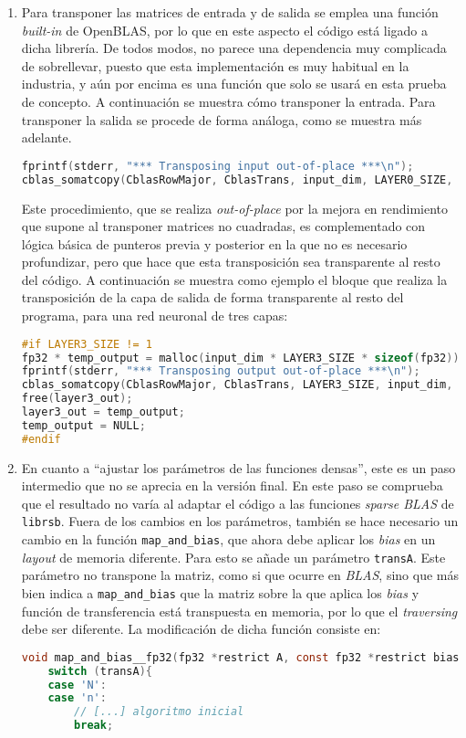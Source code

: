 \begin{enumerate}
    \item Para transponer las matrices de entrada y de salida se emplea una función \textit{built-in} de OpenBLAS, por lo que en este aspecto el código está ligado a dicha librería. De todos modos, no parece una dependencia muy complicada de sobrellevar, puesto que esta implementación es muy habitual en la industria, y aún por encima es una función que solo se usará en esta prueba de concepto. A continuación se muestra cómo transponer la entrada. Para transponer la salida se procede de forma análoga, como se muestra más adelante.\medskip
\begin{lstlisting}[language=C]
fprintf(stderr, "*** Transposing input out-of-place ***\n");
cblas_somatcopy(CblasRowMajor, CblasTrans, input_dim, LAYER0_SIZE, 1.f, (float *) input, LAYER0_SIZE, (float *) temp_input, input_dim);
\end{lstlisting}

    Este procedimiento, que se realiza \textit{out-of-place} por la mejora en rendimiento que supone al transponer matrices no cuadradas, es complementado con lógica básica de punteros previa y posterior en la que no es necesario profundizar, pero que hace que esta transposición sea transparente al resto del código. A continuación se muestra como ejemplo el bloque que realiza la transposición de la capa de salida de forma transparente al resto del programa, para una red neuronal de tres capas:\medskip
\begin{lstlisting}[language=C]
#if LAYER3_SIZE != 1
fp32 * temp_output = malloc(input_dim * LAYER3_SIZE * sizeof(fp32));
fprintf(stderr, "*** Transposing output out-of-place ***\n");
cblas_somatcopy(CblasRowMajor, CblasTrans, LAYER3_SIZE, input_dim, 1.f, (float *) layer3_out, input_dim, (float *) temp_output, LAYER3_SIZE);
free(layer3_out);
layer3_out = temp_output;
temp_output = NULL;
#endif
\end{lstlisting}

    \item En cuanto a ``ajustar los parámetros de las funciones densas'', este es un paso intermedio que no se aprecia en la versión final. En este paso se comprueba que el resultado no varía al adaptar el código a las funciones \textit{sparse BLAS} de \texttt{librsb}. Fuera de los cambios en los parámetros, también se hace necesario un cambio en la función \texttt{map\_and\_bias}, que ahora debe aplicar los \textit{bias} en un \textit{layout} de memoria diferente. Para esto se añade un parámetro \texttt{transA}. Este parámetro no transpone la matriz, como si que ocurre en \textit{BLAS}, sino que más bien indica a \texttt{map\_and\_bias} que la matriz sobre la que aplica los \textit{bias} y función de transferencia está transpuesta en memoria, por lo que el \textit{traversing} debe ser diferente. La modificación de dicha función consiste en:\medskip
\begin{lstlisting}[language=C]
void map_and_bias__fp32(fp32 *restrict A, const fp32 *restrict bias, const uint32_t M, const uint32_t N, const char transA, fp32 (* map_function)(fp32 x)){
    switch (transA){
    case 'N':
    case 'n':
        // [...] algoritmo inicial
        break;


\end{lstlisting}
\end{enumerate}
